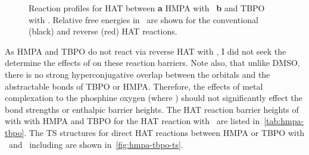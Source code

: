 \begin{figure}[!htbp]
  \centering

  \caption[Reaction profiles for HAT between HMPA with \bno\, and TBPO with \bno.]{Reaction profiles for HAT between \textbf{a} HMPA with \bno\, \textbf{b} and TBPO with \bno. Relative free energies in \kcalmol\ are shown for the conventional (black) and reverse (red) HAT reactions.}
  \label{fig:hmpa-tbpo-bno}
\end{figure}


As HMPA and TBPO do not react via reverse HAT with \bno, I did not seek the determine the effects of  on these reaction barriers. Note also, that unlike DMSO, there is no strong hyperconjugative overlap between the  orbitals and the abstractable  bonds of TBPO or HMPA. Therefore, the effects of metal complexation to the phosphine oxygen (where ) should not significantly effect the  bond strengths or enthalpic barrier heights. The HAT reaction barrier heights of  with with HMPA and TBPO for the HAT reaction with \cumo\ are listed in~\ref{tab:hmpa-tbpo}. The TS structures for direct HAT reactions between HMPA or TBPO with \cumo\ and \bno\ including  are shown in~\ref{fig:hmpa-tbpo-ts}.


